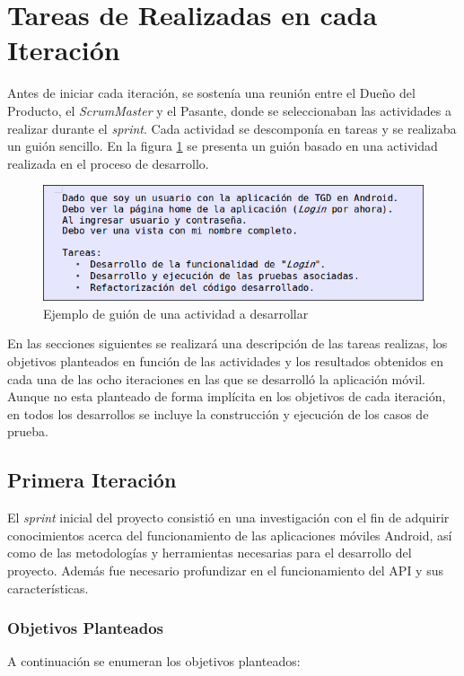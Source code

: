 \section{Tareas de Realizadas en cada Iteración}

Antes de iniciar cada iteración, se sostenía una reunión entre el Dueño del Producto, el \textit{ScrumMaster} y el Pasante, donde se seleccionaban las actividades a realizar durante el \textit{sprint}. Cada actividad se descomponía en tareas y se realizaba un guión sencillo. En la figura \ref{fig:ejemplo_guion} se presenta un guión basado en una actividad realizada en el proceso de desarrollo.


\begin{figure}[h]
	\begin{center}
		\includegraphics[scale=0.6]{imagenes/guion.png}
	\end{center}
	\caption{
		\label{fig:ejemplo_guion}
		Ejemplo de guión de una actividad a desarrollar
	}
\end{figure}


En las secciones siguientes se realizará una descripción de las tareas realizas, los objetivos planteados en función de las actividades y los resultados obtenidos en cada una de las ocho iteraciones en las que se desarrolló la aplicación móvil. Aunque no esta planteado de forma implícita en los objetivos de cada iteración, en todos los desarrollos se incluye la construcción y ejecución de los casos de prueba.

\subsection{Primera Iteración}

El \textit{sprint} inicial del proyecto consistió en una investigación con el fin de adquirir conocimientos acerca del funcionamiento de las aplicaciones móviles Android, así como de las metodologías y herramientas necesarias para el desarrollo del proyecto. Además fue necesario profundizar en el funcionamiento del API y sus características.

\subsubsection{Objetivos Planteados}
A continuación se enumeran los objetivos planteados:


